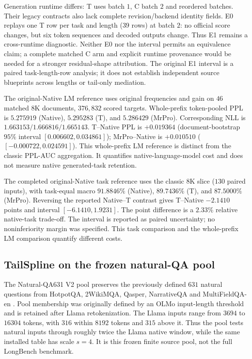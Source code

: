 Generation runtime differs: T uses batch $1$, C batch $2$ and reordered
batches. Their legacy contracts also lack complete revision/backend identity
fields. E0 replays one T row per task and length ($39$ rows) at batch $2$:
no official score changes, but six token sequences and decoded outputs change.
Thus E1 remains a cross-runtime diagnostic. Neither E0 nor the interval permits
an equivalence claim; a complete matched C arm and explicit runtime provenance
would be needed for a stronger residual-shape attribution. The original E1
interval is a paired task-length-row analysis; it does not establish independent
source blueprints across lengths or tail-only mediation.

The original-Native LM reference uses original frequencies and gain on $46$
matched $8$K documents, $376{,}832$ scored targets. Whole-prefix token-pooled
PPL is $5.275919$ (Native), $5.295283$ (T), and $5.286429$ (MrPro).
Corresponding NLL is $1.663153/1.666816/1.665143$. T--Native PPL is
$+0.019364$ (document-bootstrap $95\%$ interval $[0.006602,0.034861]$);
MrPro--Native is $+0.010510$ ($[-0.000722,0.024591]$).
This whole-prefix LM reference is distinct from the classic PPL-AUC
aggregation. It quantifies native-language-model cost and does not measure
native generated-task retention.


The completed original-Native task reference uses the classic $8$K slice
($130$ paired inputs), with task-equal macro $91.8846\%$ (Native),
$89.7436\%$ (T), and $87.5000\%$ (MrPro). Reversing the reported
Native--T contrast gives T--Native $-2.1410$ points and interval
$[-6.1410,1.9231]$. The point difference is a $2.33\%$ relative native-task trade-off. The interval
is reported as paired uncertainty; no noninferiority margin was specified.
This task comparison and the whole-prefix LM comparison quantify different costs.

\subsection{TailSpline on the frozen natural-QA pool}
\label{sec:tailspline-natural-qa}
The Natural-QA631 V2 pool preserves the previously defined $631$ natural
questions from HotpotQA, 2WikiMQA, Qasper, NarrativeQA and MultiFieldQA-en
\citep{bai2024longbench}. Pool membership was originally defined by an OLMo
input-length threshold and is retained after Llama retokenization. The Llama
inputs range from $3694$ to $16304$ tokens, with $316$ within $8192$ tokens
and $315$ above it. Thus the pool tests natural inputs through roughly twice
the Llama native window, while the same installed table has scale $s=4$.
It is this frozen finite source pool, not the full LongBench benchmark.

